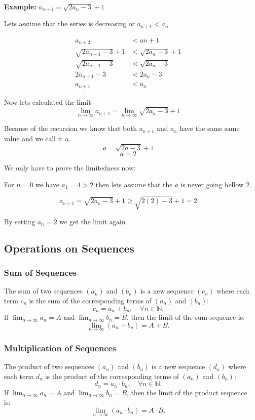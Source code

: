 \textbf{Example: } \(a_{n + 1} = \sqrt{2a_n - 3} + 1\)

Lets assume that the series is decreasing or \(a_{n + 1} < a_{n}\)

\begin{align*}
    a_{n + 2} &< a{n + 1} \\
    \sqrt{2a_{n + 1} -3} + 1 &< \sqrt{2a_{n} - 3} + 1 \\
    \sqrt{2a_{n + 1} -3} &< \sqrt{2a_{n} - 3} \\
    2a_{n + 1} - 3 &< 2a_{n} - 3 \\
    a_{n + 1} &< a_{n}
\end{align*}
\QED

Now lets calculated the limit
\[
\lim_{n \rightarrow \infty} a_{n + 1} = \lim_{n \rightarrow \infty} \sqrt{2a_n - 3} + 1
\]

Because of the recursion we know that both \(a_{n + 1}\) and \(a_n\) have the same same value and we call it \(a\).
\[
a = \sqrt{2a -3} +1
\]
\[
a = 2
\]

We only have to prove the limitedness now:

For \(n = 0\) we have \(a_1 = 4 > 2\) then lets assume that the \(a\) is never going bellow 2.

\[
a_{n + 1} = \sqrt{2a_n - 3} + 1 \ge \sqrt{2(2) - 3} + 1 = 2
\]

By setting \(a_n = 2\) we get the limit again

\QED

\subsection{Operations on Sequences}

\subsubsection{Sum of Sequences}
The sum of two sequences \((a_n)\) and \((b_n)\) is a new sequence \((c_n)\) where each term \(c_n\) is the sum of the corresponding terms of \((a_n)\) and \((b_n)\):
\[
c_n = a_n + b_n, \quad \forall n \in \mathbb{N}.
\]
If \(\lim_{n \to \infty} a_n = A\) and \(\lim_{n \to \infty} b_n = B\), then the limit of the sum sequence is:
\[
\lim_{n \to \infty} (a_n + b_n) = A + B.
\]

\subsubsection{Multiplication of Sequences}
The product of two sequences \((a_n)\) and \((b_n)\) is a new sequence \((d_n)\) where each term \(d_n\) is the product of the corresponding terms of \((a_n)\) and \((b_n)\):
\[
d_n = a_n \cdot b_n, \quad \forall n \in \mathbb{N}.
\]
If \(\lim_{n \to \infty} a_n = A\) and \(\lim_{n \to \infty} b_n = B\), then the limit of the product sequence is:
\[
\lim_{n \to \infty} (a_n \cdot b_n) = A \cdot B.
\]

